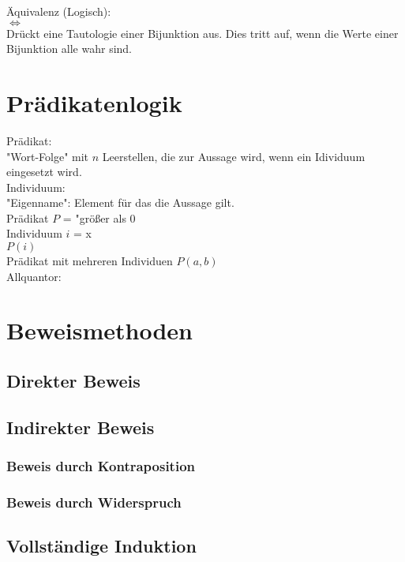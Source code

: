Äquivalenz (Logisch): \\
$\Leftrightarrow$ \\
Drückt eine Tautologie einer Bijunktion aus.
Dies tritt auf, wenn die Werte einer Bijunktion alle wahr sind.


\section{Prädikatenlogik}

Prädikat: \\
"Wort-Folge" mit $n$ Leerstellen, die zur Aussage wird,
wenn ein Idividuum eingesetzt wird. \\

Individuum: \\
"Eigenname": Element für das die Aussage gilt. \\

Prädikat $P$ = "größer als 0 \\
Individuum $i$ = x \\
$P(i)$\\

Prädikat mit mehreren Individuen $P(a,b)$\\

Allquantor: \\



\section{Beweismethoden}

\subsection{Direkter Beweis}

\subsection{Indirekter Beweis}

\subsubsection{Beweis durch Kontraposition}

\subsubsection{Beweis durch Widerspruch}

\subsection{Vollständige Induktion}